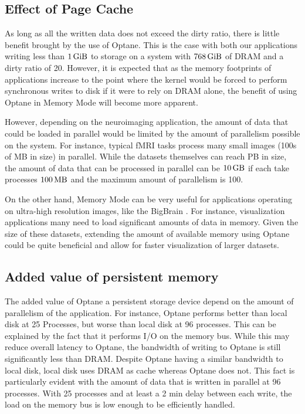 \documentclass[conference]{IEEEtran}
\newcommand{\bigbrain}{BigBrain }
\begin{document}
\subsection{Effect of Page Cache}

As long as all the written data does not exceed the dirty ratio, there is little 
benefit brought by the use of Optane. This is the case with both
our applications writing less than $\SI{1}{\gibi\byte}$ to storage on a system with 
$\SI{768}{\gibi\byte}$ of DRAM and a dirty ratio of 20. However, it is expected 
that as the memory footprints of applications increase to the point where the kernel
would be forced to perform synchronous writes to disk if it were to rely on DRAM alone,
the benefit of using Optane in Memory Mode will become more apparent. 

However, depending on the neuroimaging application, the amount of data that could be
loaded in parallel would be limited by the amount of parallelism possible on the system.
For instance, typical fMRI tasks process many small images (100s of MB in size) in parallel.
While the datasets themselves can reach PB in size, the amount of data that can be processed in
parallel can be $\SI{10}{\giga\byte}$ if each take processes $\SI{100}{\mega\byte}$ and the 
maximum amount of parallelism is 100. 

On the other hand, Memory Mode can be very useful for applications operating on
ultra-high resolution images, like the \bigbrain. For instance, visualization applications
many need to load significant amounts of data in memory. Given the size of these datasets, 
extending the amount of available memory using Optane could be quite beneficial and allow
for faster visualization of larger datasets.


\subsection{Added value of persistent memory}

The added value of Optane a persistent storage device depend on the amount of parallelism
of the application. For instance, Optane performs better than local disk at 25 Processes,
but worse than local disk at 96 processes. This can be explained by the fact that it performs
I/O on the memory bus. While this may reduce overall latency to Optane, the bandwidth of 
writing to Optane is still significantly less than DRAM. Despite Optane having a similar bandwidth
to local disk, local disk uses DRAM as cache whereas Optane does not. This fact is 
particularly evident with the amount of data that is written in parallel at 96 processes. With 25 processes
and at least a 2 min
delay between each write, the load on the memory bus is low enough to be efficiently handled.
\end{document}
